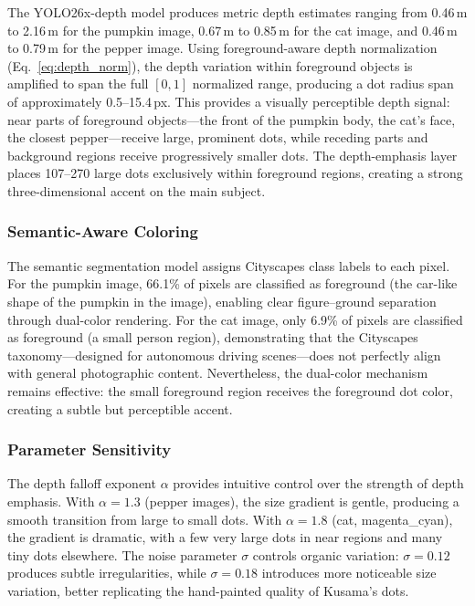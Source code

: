 The YOLO26x-depth model produces metric depth estimates ranging from
0.46\,m to 2.16\,m for the pumpkin image, 0.67\,m to 0.85\,m for the
cat image, and 0.46\,m to 0.79\,m for the pepper image. Using
foreground-aware depth normalization
(Eq.~\ref{eq:depth_norm}), the depth variation within foreground
objects is amplified to span the full $[0, 1]$ normalized range,
producing a dot radius span of approximately 0.5--15.4\,px. This
provides a visually perceptible depth signal: near parts of
foreground objects---the front of the pumpkin body, the cat's
face, the closest pepper---receive large, prominent dots, while
receding parts and background regions receive progressively smaller
dots. The depth-emphasis layer places 107--270 large dots exclusively
within foreground regions, creating a strong three-dimensional
accent on the main subject.

\subsubsection{Semantic-Aware Coloring}

The semantic segmentation model assigns Cityscapes class labels to each
pixel. For the pumpkin image, 66.1\% of pixels are classified as
foreground (the car-like shape of the pumpkin in the image), enabling
clear figure--ground separation through dual-color rendering. For the
cat image, only 6.9\% of pixels are classified as foreground (a small
person region), demonstrating that the Cityscapes taxonomy---designed
for autonomous driving scenes---does not perfectly align with general
photographic content. Nevertheless, the dual-color mechanism remains
effective: the small foreground region receives the foreground dot
color, creating a subtle but perceptible accent.

\subsubsection{Parameter Sensitivity}
\label{sec:exp:param}

The depth falloff exponent $\alpha$ provides intuitive control over the
strength of depth emphasis. With $\alpha = 1.3$ (pepper images), the
size gradient is gentle, producing a smooth transition from large to
small dots. With $\alpha = 1.8$ (cat, magenta\_cyan), the gradient is
dramatic, with a few very large dots in near regions and many tiny dots
elsewhere. The noise parameter $\sigma$ controls organic variation:
$\sigma = 0.12$ produces subtle irregularities, while $\sigma = 0.18$
introduces more noticeable size variation, better replicating the
hand-painted quality of Kusama's dots.

